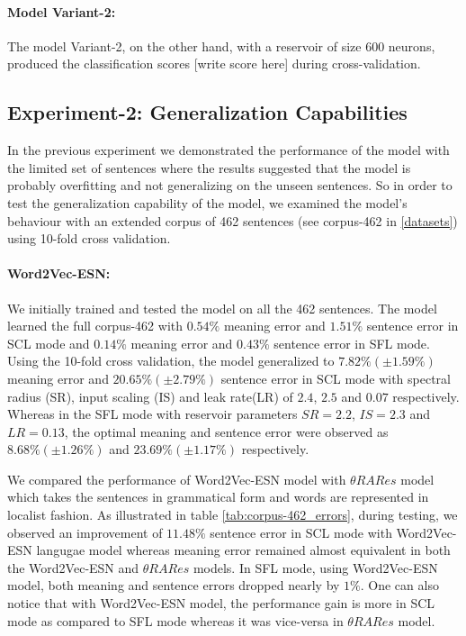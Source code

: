 \paragraph{Model Variant-2:} The model Variant-2, on the other hand, with a reservoir of size 600 neurons, produced the classification scores [write score here] during cross-validation. 

\subsection{Experiment-2: Generalization Capabilities} \label{exp-2}

In the previous experiment we demonstrated the performance of the model with the limited set of sentences where the results suggested that the model is probably overfitting and not generalizing on the unseen sentences. So in order to test the generalization capability of the model, we examined the model's behaviour with an extended corpus of 462 sentences (see corpus-462 in \ref{datasets}) using 10-fold cross validation. 

\paragraph{Word2Vec-ESN:} We initially trained and tested the model on all the 462 sentences. The model learned the full corpus-462 with $0.54\%$ meaning error and $1.51\%$ sentence error in SCL mode and $0.14\%$ meaning error and $0.43\%$ sentence error in SFL mode. Using the 10-fold cross validation, the model generalized to $7.82\% (\pm 1.59\%) $ meaning error and $20.65\% (\pm 2.79\%)$ sentence error in SCL mode with spectral radius (SR), input scaling (IS) and leak rate(LR) of $2.4$, $2.5$ and $0.07$ respectively. Whereas in the SFL mode with reservoir parameters $SR = 2.2$, $IS = 2.3$ and $LR = 0.13$, the optimal meaning and sentence error were observed as $8.68\% (\pm 1.26\%)$ and $23.69\% (\pm 1.17\%)$ respectively.

We compared the performance of Word2Vec-ESN model with $\theta RARes$ model which takes the sentences in grammatical form and words are represented in localist fashion. As illustrated in table \ref{tab:corpus-462_errors}, during testing, we observed an improvement of $11.48 \%$ sentence error in SCL mode with Word2Vec-ESN langugae model whereas meaning error remained almost equivalent in both the Word2Vec-ESN and $\theta RARes$ models. In SFL mode, using Word2Vec-ESN model, both meaning and sentence errors dropped nearly by $1 \%$. One can also notice that with Word2Vec-ESN model, the performance gain is more in SCL mode as compared to SFL mode whereas it was vice-versa in $\theta RARes$ model. 

